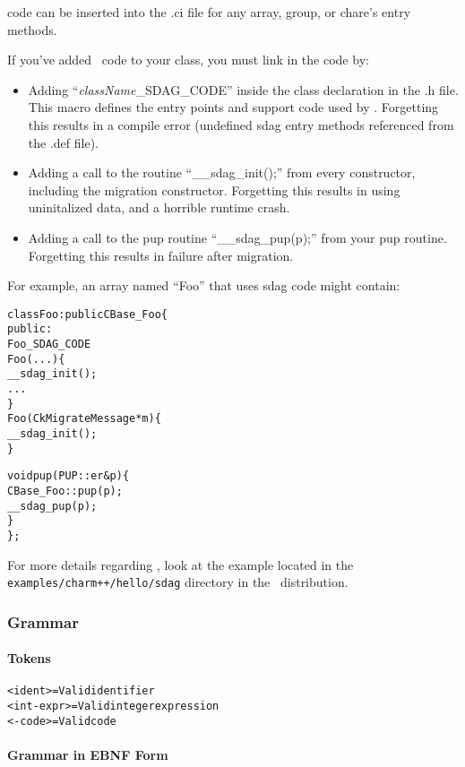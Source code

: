 \sdag{} code can be inserted into the .ci file for any array, group, or chare's entry methods.

If you've added \sdag\ code to your class, you must link in the code by:
\begin{itemize}
  \item Adding ``{\it className}\_SDAG\_CODE'' inside the class declaration
     in the .h file.  This macro defines the entry points and support
     code used by \sdag{}.  Forgetting this results in a compile error
     (undefined sdag entry methods referenced from the .def file).
  \item Adding a call to the routine ``\_\_sdag\_init();'' from every constructor,
     including the migration constructor.  Forgetting this results in
     using uninitalized data, and a horrible runtime crash.
  \item Adding a call to the pup routine ``\_\_sdag\_pup(p);'' from your pup routine.
     Forgetting this results in failure after migration.
\end{itemize}

For example, an array named ``Foo'' that uses sdag code might contain:

\begin{alltt}
class Foo : public CBase_Foo \{
public:
    Foo_SDAG_CODE
    Foo(...) \{
       __sdag_init();
       ...
    \}
    Foo(CkMigrateMessage *m) \{
       __sdag_init();
    \}
    
    void pup(PUP::er &p) \{
       CBase_Foo::pup(p);
       __sdag_pup(p);
    \}
\};
\end{alltt}

For more details regarding \sdag{}, look at the example located in the 
{\tt examples/charm++/hello/sdag} directory in the \charmpp\ distribution.


\subsubsection{Grammar}

\paragraph{Tokens}

\begin{alltt}
  <ident> = Valid \CC{} identifier 
  <int-expr> = Valid \CC{} integer expression 
  <\CC{}-code> = Valid \CC{} code 
\end{alltt}

\paragraph{Grammar in EBNF Form}

